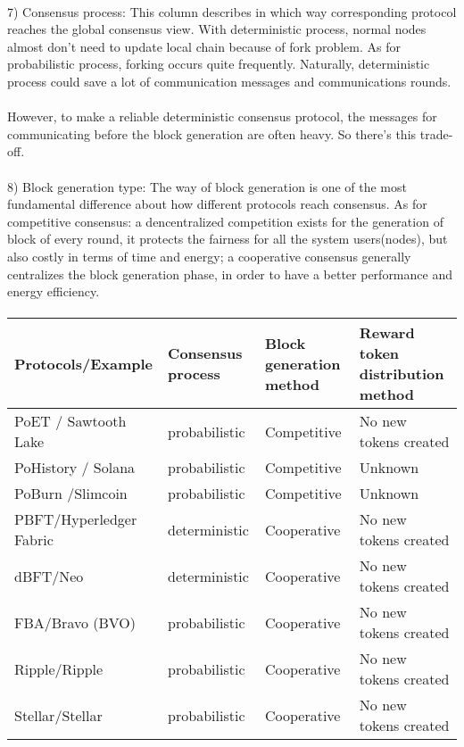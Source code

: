 \documentclass[doublespacing]{bmcart}
\begin{document}
\begin{CJK*}{UTF8}{gbsn}
	 \paragraph{}
7) Consensus process: This column describes in which way corresponding protocol reaches the global consensus view. With deterministic process, normal nodes almost don't need to update local chain because of fork problem. As for probabilistic process, forking occurs quite frequently. Naturally, deterministic process could save a lot of communication messages and communications rounds.
 \paragraph{}
 However, to make a reliable deterministic consensus protocol, the messages for communicating before the block generation are often heavy. So there's this trade-off.
	 \paragraph{}
8) Block generation type: The way of block generation is one of the most fundamental difference about how different protocols reach consensus. As for competitive consensus: a dencentralized competition exists for the generation of block of every round, it protects the fairness for all the system users(nodes), but also costly in terms of time and energy; a cooperative consensus generally centralizes the block generation phase, in order to have a better performance and energy efficiency.

\paragraph{}
\begin{tabular}{p{2cm}p{3cm}p{3cm}p{3cm}}
\hline
Protocols/E\-xample  & Consensus process & Block generation method & Reward token distribution method \\ \hline
PoET / Sawtooth Lake & probabilistic & Competitive & No new tokens created \\ \hline

PoHistory / Solana & probabilistic & Competitive & Unknown \\ \hline
PoBurn /\newline Slimcoin & probabilistic & Competitive &  Unknown  \\ \hline
PBFT/Hyp\-erledger Fabric & deterministic & Cooperative & No new tokens created  \\ \hline
dBFT/Neo & deterministic & Cooperative & No new tokens created   \\ \hline
FBA/Bravo (BVO) & probabilistic & Cooperative & No new tokens created  \\ \hline
Ripple/Ripple & probabilistic & Cooperative & No new tokens created  \\ \hline
Stellar/Stellar & probabilistic & Cooperative & No new tokens created   \\ \hline
\end{tabular}

\end{CJK*}
\end{document}

